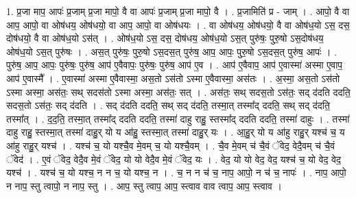 \documentclass[17pt]{extarticle}
\begin{document}
1. प्र॒जा माप॒ आपः॑ प्र॒जाम् प्र॒जा मापो॒ वै वा आपः॑ प्र॒जाम् प्र॒जा मापो॒ वै । . प्र॒जामिति॑ प्र - जाम् । . आपो॒ वै वा आप॒ आपो॒ वा ओष॑धय॒ ओष॑धयो॒ वा आप॒ आपो॒ वा ओष॑धयः । . वा ओष॑धय॒ ओष॑धयो॒ वै वा ओष॑ध॒यो ऽस॒ दस॒ दोष॑धयो॒ वै वा ओष॑ध॒यो ऽस॑त् । . ओष॑ध॒यो ऽस॒ दस॒ दोष॑धय॒ ओष॑ध॒यो ऽस॒त् पुरु॑षः॒ पुरु॒षो ऽस॒दोष॑धय॒ ओष॑ध॒यो ऽस॒त् पुरु॑षः । . अस॒त् पुरु॑षः॒ पुरु॒षो ऽस॒दस॒त् पुरु॑ष॒ आप॒ आपः॒ पुरु॒षो ऽस॒दस॒त् पुरु॑ष॒ आपः॑ । . पुरु॑ष॒ आप॒ आपः॒ पुरु॑षः॒ पुरु॑ष॒ आप॑ ए॒वैवापः॒ पुरु॑षः॒ पुरु॑ष॒ आप॑ ए॒व । . आप॑ ए॒वैवाप॒ आप॑ ए॒वास्मा॑ अस्मा ए॒वाप॒ आप॑ ए॒वास्मै᳚ । . ए॒वास्मा॑ अस्मा ए॒वैवास्मा॒ अस॒तो ऽस॑तो ऽस्मा ए॒वैवास्मा॒ अस॑तः । . अ॒स्मा॒ अस॒तो ऽस॑तो ऽस्मा अस्मा॒ अस॑तः॒ सथ् सदस॑तो ऽस्मा अस्मा॒ अस॑तः॒ सत् । . अस॑तः॒ सथ् सदस॒तो ऽस॑तः॒ सद् द॑दति ददति॒ सदस॒तो ऽस॑तः॒ सद् द॑दति । . सद् द॑दति ददति॒ सथ् सद् द॑दति॒ तस्मा॒त् तस्मा᳚द् ददति॒ सथ् सद् द॑दति॒ तस्मा᳚त् । . द॒द॒ति॒ तस्मा॒त् तस्मा᳚द् ददति ददति॒ तस्मा॑ दाहु राहु॒ स्तस्मा᳚द् ददति ददति॒ तस्मा॑ दाहुः । . तस्मा॑ दाहु राहु॒ स्तस्मा॒त् तस्मा॑ दाहु॒र् यो य आ॑हु॒ स्तस्मा॒त् तस्मा॑ दाहु॒र् यः । . आ॒हु॒र् यो य आ॑हु राहु॒र् यश्च॑ च॒ य आ॑हु राहु॒र् यश्च॑ । . यश्च॑ च॒ यो यश्चै॒व मे॒वम् च॒ यो यश्चै॒वम् । . चै॒व मे॒वम् च॑ चै॒वं ॅवेद॒ वेदै॒वम् च॑ चै॒वं ॅवेद॑ । . ए॒वं ॅवेद॒ वेदै॒व मे॒वं ॅवेद॒ यो यो वेदै॒व मे॒वं ॅवेद॒ यः । . वेद॒ यो यो वेद॒ वेद॒ यश्च॑ च॒ यो वेद॒ वेद॒ यश्च॑ । . यश्च॑ च॒ यो यश्च॒ न न च॒ यो यश्च॒ न । . च॒ न न च॑ च॒ नाप॒ आपो॒ न च॑ च॒ नापः॑ । . नाप॒ आपो॒ न नाप॒ स्तु त्वापो॒ न नाप॒ स्तु । . आप॒ स्तु त्वाप॒ आप॒ स्त्वाव वाव त्वाप॒ आप॒ स्त्वाव । \newline
\end{document}

